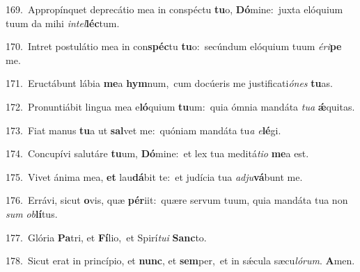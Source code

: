 {\numbfont\textcolor{\numbcolor}{169.}}~Appropínquet deprecátio mea in conspéctu \textbf{tu}\-o, \textbf{Dó}\-mine:~\star juxta elóquium tuum da mihi \textit{in}\-\textit{tel}\textbf{léc}tum.\par
{\numbfont\textcolor{\numbcolor}{170.}}~Intret postulátio mea in con\-\textbf{spéc}\-tu \textbf{tu}\-o:~\star secúndum elóquium tuum \textit{é}\-\textit{ri}\textbf{pe} me.\par
{\numbfont\textcolor{\numbcolor}{171.}}~Eructábunt lábia \textbf{me}\-a \textbf{hym}\-num,~\star cum docúeris me justificati\-\textit{ó}\-\textit{nes} \textbf{tu}\-as.\par
{\numbfont\textcolor{\numbcolor}{172.}}~Pronuntiábit lingua mea e\-\textbf{ló}\-quium \textbf{tu}\-um:~\star quia ómnia mandáta \textit{tu}\-\textit{a} \textbf{ǽ}\-quitas.\par
{\numbfont\textcolor{\numbcolor}{173.}}~Fiat manus \textbf{tu}\-a ut \textbf{sal}\-vet me:~\star quóniam mandáta tu\textit{a} \textit{e}\-\textbf{lé}gi.\par
{\numbfont\textcolor{\numbcolor}{174.}}~Concupívi salutáre \textbf{tu}\-um, \textbf{Dó}\-mine:~\star et lex tua meditá\-\textit{ti}\-\textit{o} \textbf{me}\-a est.\par
{\numbfont\textcolor{\numbcolor}{175.}}~Vivet ánima mea, \textbf{et} lau\-\textbf{dá}\-bit te:~\star et judícia tua \textit{ad}\-\textit{ju}\textbf{vá}bunt me.\par
{\numbfont\textcolor{\numbcolor}{176.}}~Errávi, sicut \textbf{o}\-vis, quæ \textbf{pér}\-iit:~\star quære servum tuum, quia mandáta tua non \textit{sum} \textit{ob}\-\textbf{lí}tus.\par
{\numbfont\textcolor{\numbcolor}{177.}}~Glória \textbf{Pa}\-tri, et \textbf{Fí}\-lio,~\star et Spirí\-\textit{tu}\-\textit{i} \textbf{Sanc}\-to.\par
{\numbfont\textcolor{\numbcolor}{178.}}~Sicut erat in princípio, et \textbf{nunc}\-, et \textbf{sem}\-per,~\star et in sǽcula sæcu\-\textit{ló}\-\textit{rum}. \textbf{A}\-men.\par
